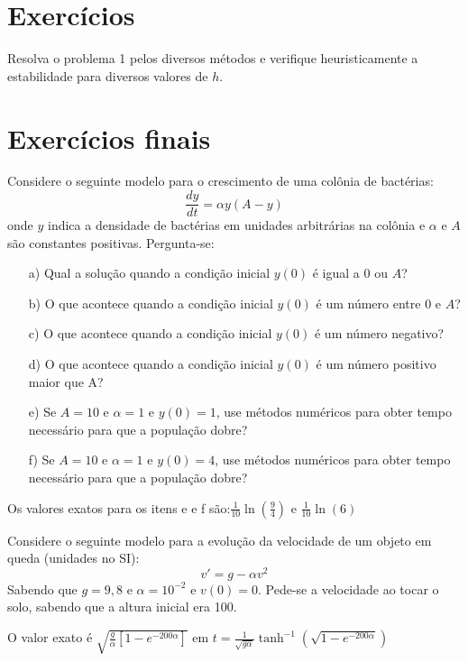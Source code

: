 \section*{Exercícios}

\begin{Exercise} Resolva o problema 1 pelos diversos métodos e verifique heuristicamente a estabilidade para diversos valores de $h$.
\end{Exercise}

\section*{Exercícios finais}

\begin{Exercise} Considere o seguinte modelo para o crescimento de uma colônia de bactérias:
$$\frac{dy}{dt}=\alpha y (A-y)$$
onde $y$ indica a densidade de bactérias em unidades arbitrárias na colônia e $\alpha$ e $A$ são constantes positivas.
Pergunta-se:
\begin{itemize}
\item[a)] Qual a solução quando a condição inicial $y(0)$ é igual a $0$ ou $A$?
\item[b)] O que acontece quando a condição inicial $y(0)$ é um número entre $0$ e $A$?
\item[c)] O que acontece quando a condição inicial $y(0)$ é um número negativo?
\item[d)] O que acontece quando a condição inicial $y(0)$ é um número positivo maior que A?
\item[e)] Se $A=10$ e $\alpha=1$ e $y(0)=1$, use métodos numéricos para obter tempo necessário para que a população dobre?
\item[f)] Se $A=10$ e $\alpha=1$ e $y(0)=4$, use métodos numéricos para obter tempo necessário para que a população dobre?
\end{itemize}
\end{Exercise}
\begin{Answer}
  \begin{tiny}
Os valores exatos para os itens e e f são:$\frac{1}{10}\ln\left(\frac{9}{4}\right)$ e $\frac{1}{10}\ln\left(6\right)$    
  \end{tiny}
\end{Answer}

\begin{Exercise} Considere o seguinte modelo para a evolução da velocidade de um objeto em queda (unidades no SI):
$$v'=g-\alpha v^2$$
Sabendo que $g=9,8$ e $\alpha=10^{-2}$ e $v(0)=0$. Pede-se a velocidade ao tocar o solo, sabendo que a altura inicial era 100.

\end{Exercise}
\begin{Answer}
  \begin{tiny}
O valor exato é $\sqrt{\frac{g}{\alpha}\left[1-e^{{-200\alpha}}\right]}$ em $t=\frac{1}{\sqrt{g\alpha}}\tanh^{-1}\left(\sqrt{1-e^{{-200\alpha}}}\right)$    
  \end{tiny}
\end{Answer}


